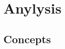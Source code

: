 \chapter{Anylysis}
\label{chap:anylysis}

\lipsum[1-2]

\minitoc

\newpage

\section{Concepts}

\lipsum[1-2]
